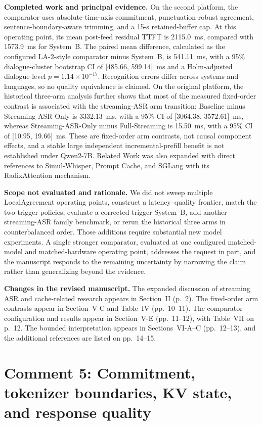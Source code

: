 \documentclass[11pt]{article}
\newcommand{\completed}{\vspace{0.25em}\noindent\textbf{Completed work and principal evidence.} }
\newcommand{\scope}{\vspace{0.25em}\noindent\textbf{Scope not evaluated and rationale.} }
\newcommand{\changes}{\vspace{0.25em}\noindent\textbf{Changes in the revised manuscript.} }
\begin{document}
\completed On the second platform, the comparator uses absolute-time-axis commitment, punctuation-robust agreement, sentence-boundary-aware trimming, and a 15-s retained-buffer cap. At this operating point, its mean post-feed residual TTFT is 2115.0~ms, compared with 1573.9~ms for System~B. The paired mean difference, calculated as the configured LA-2-style comparator minus System~B, is 541.11~ms, with a 95\% dialogue-cluster bootstrap CI of [485.66, 599.14]~ms and a Holm-adjusted dialogue-level $p=1.14\times10^{-17}$. Recognition errors differ across systems and languages, so no quality equivalence is claimed. On the original platform, the historical three-arm analysis further shows that most of the measured fixed-order contrast is associated with the streaming-ASR arm transition: Baseline minus Streaming-ASR-Only is 3332.13~ms, with a 95\% CI of [3064.38, 3572.61]~ms, whereas Streaming-ASR-Only minus Full-Streaming is 15.50~ms, with a 95\% CI of [10.95, 19.66]~ms. These are fixed-order arm contrasts, not causal component effects, and a stable large independent incremental-prefill benefit is not established under Qwen2-7B. Related Work was also expanded with direct references to Simul-Whisper, Prompt Cache, and SGLang with its RadixAttention mechanism.

\scope We did not sweep multiple LocalAgreement operating points, construct a latency--quality frontier, match the two trigger policies, evaluate a corrected-trigger System~B, add another streaming-ASR family benchmark, or rerun the historical three arms in counterbalanced order. Those additions require substantial new model experiments. A single stronger comparator, evaluated at one configured matched-model and matched-hardware operating point, addresses the request in part, and the manuscript responds to the remaining uncertainty by narrowing the claim rather than generalizing beyond the evidence.

\changes The expanded discussion of streaming ASR and cache-related research appears in Section~II (p.~2). The fixed-order arm contrasts appear in Section~V-C and Table~IV (pp.~10--11). The comparator configuration and results appear in Section~V-E (pp.~11--12), with Table~VII on p.~12. The bounded interpretation appears in Sections~VI-A--C (pp.~12--13), and the additional references are listed on pp.~14--15.

\section*{Comment 5: Commitment, tokenizer boundaries, KV state, and response quality}
\end{document}

